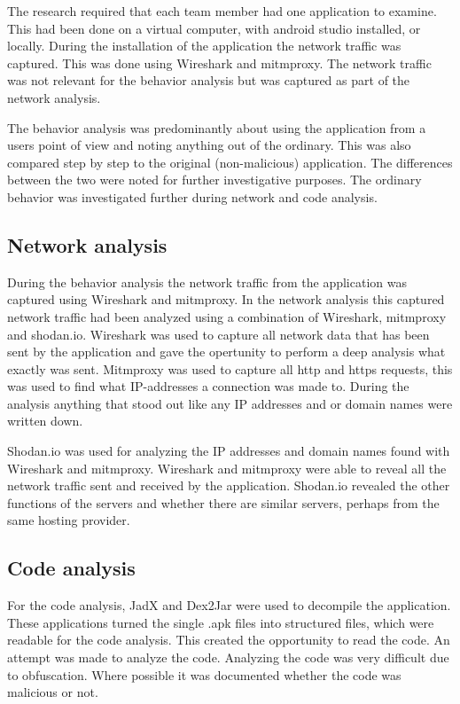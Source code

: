 The research required that each team member had one application to examine.
This had been done on a virtual computer, with android studio installed, or locally.
During the installation of the application the network traffic was captured.
This was done using Wireshark and mitmproxy.
The network traffic was not relevant for the behavior analysis but was captured as part of the network analysis.

The behavior analysis was predominantly about using the application from a users point of view and noting anything out of the ordinary.
This was also compared step by step to the original (non-malicious) application.
The differences between the two were noted for further investigative purposes.
The ordinary behavior was investigated further during network and code analysis.

\subsection{Network analysis}

During the behavior analysis the network traffic from the application was captured using Wireshark and mitmproxy.
In the network analysis this captured network traffic had been analyzed using a combination of Wireshark, mitmproxy and shodan.io.
Wireshark was used to capture all network data that has been sent by the application and gave the opertunity to perform a deep analysis what exactly was sent.
Mitmproxy was used to capture all http and https requests, this was used to find what IP-addresses a connection was made to.
During the analysis anything that stood out like any IP addresses and or domain names were written down.

Shodan.io was used for analyzing the IP addresses and domain names found with Wireshark and mitmproxy.
Wireshark and mitmproxy were able to reveal all the network traffic sent and received by the application.
Shodan.io revealed the other functions of the servers and whether there are similar servers, perhaps from the same hosting provider.

\subsection{Code analysis}

For the code analysis, JadX and Dex2Jar were used to decompile the application.
These applications turned the single .apk files into structured files, which were readable for the code analysis.
This created the opportunity to read the code.
An attempt was made to analyze the code.
Analyzing the code was very difficult due to obfuscation.
Where possible it was documented whether the code was malicious or not.

